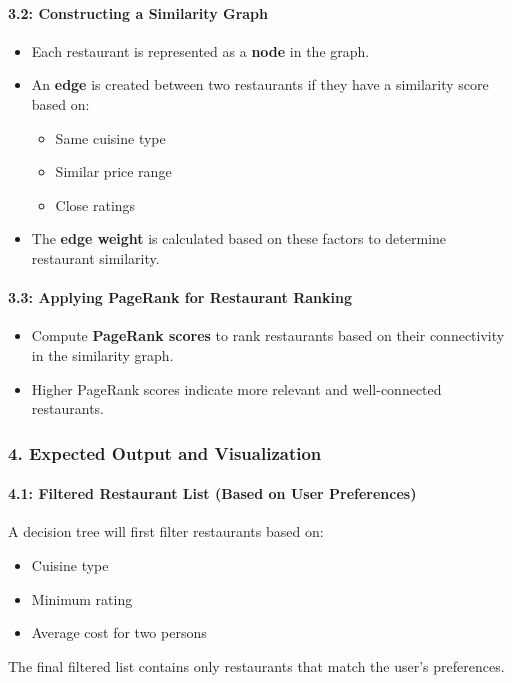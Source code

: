 \documentclass[fontsize=11pt]{article}
\begin{document}
\paragraph*{3.2: Constructing a Similarity Graph}
\begin{itemize}
    \item Each restaurant is represented as a \textbf{node} in the graph.
    \item An \textbf{edge} is created between two restaurants if they have a similarity score based on:
        \begin{itemize}
            \item Same cuisine type
            \item Similar price range
            \item Close ratings
        \end{itemize}
    \item The \textbf{edge weight} is calculated based on these factors to determine restaurant similarity.
\end{itemize}

\paragraph*{3.3: Applying PageRank for Restaurant Ranking}
\begin{itemize}
    \item Compute \textbf{PageRank scores} to rank restaurants based on their connectivity in the similarity graph.
    \item Higher PageRank scores indicate more relevant and well-connected restaurants.
\end{itemize}


\subsubsection*{4. Expected Output and Visualization}
\paragraph*{4.1: Filtered Restaurant List (Based on User Preferences)}
A decision tree will first filter restaurants based on:
\begin{itemize}
    \item Cuisine type
    \item Minimum rating
    \item Average cost for two persons
\end{itemize}
The final filtered list contains only restaurants that match the user’s preferences.
\end{document}

